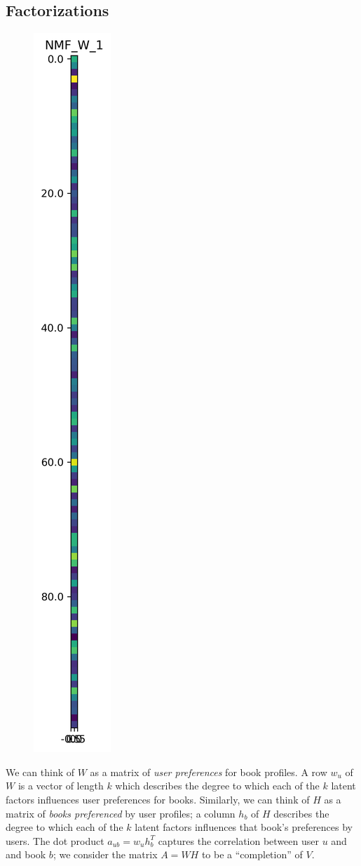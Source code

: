 \documentclass[11pt]{article}
\begin{document}


\newpage

    \hypertarget{factorizations}{%
\subsection{Factorizations}\label{factorizations}}


\begin{figure}
    \centering
    \includegraphics[height=0.9\textwidth, trim=0.2cm 0cm 0.2cm 0cm]{../image/goodreads-models/nmf-W-1.png}
    \caption[NMF-W-1]{%
    }
     \label{fig:nmf-W-1}
\end{figure}

    We can think of \(W\) as a matrix of \emph{user preferences} for book profiles.
A row \(w_u\) of \(W\) is a vector of length \(k\) which describes the
degree to which each of the \(k\) latent factors influences user
preferences for books. Similarly, we can think of \(H\) as a matrix of \emph{books preferenced} by user profiles;
a column \(h_b\) of \(H\) describes
the degree to which each of the \(k\) latent factors influences that
book's preferences by users.
The dot product \(a_{ub} = w_u h_b^T\) captures the correlation between
user \(u\) and and book \(b\); we consider the matrix \(A = WH\) to be a ``completion'' of \(V\).
\end{document}
